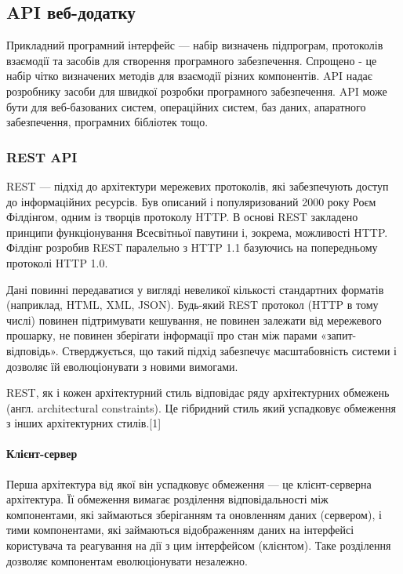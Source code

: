 
\subsection{API веб-додатку}
Прикладний програмний інтерфейс — набір визначень підпрограм, протоколів взаємодії та засобів для створення програмного забезпечення. Спрощено - це набір чітко визначених методів для взаємодії різних компонентів. API надає розробнику засоби для швидкої розробки програмного забезпечення. API може бути для веб-базованих систем, операційних систем, баз даних, апаратного забезпечення, програмних бібліотек тощо.

\subsubsection{REST API}
REST — підхід до архітектури мережевих протоколів, які забезпечують доступ до інформаційних ресурсів. Був описаний і популяризований 2000 року Роєм Філдінгом, одним із творців протоколу HTTP. В основі REST закладено принципи функціонування Всесвітньої павутини і, зокрема, можливості HTTP. Філдінг розробив REST паралельно з HTTP 1.1 базуючись на попередньому протоколі HTTP 1.0.

Дані повинні передаватися у вигляді невеликої кількості стандартних форматів (наприклад, HTML, XML, JSON). Будь-який REST протокол (HTTP в тому числі) повинен підтримувати кешування, не повинен залежати від мережевого прошарку, не повинен зберігати інформації про стан між парами «запит-відповідь». Стверджується, що такий підхід забезпечує масштабовність системи і дозволяє їй еволюціонувати з новими вимогами.

REST, як і кожен архітектурний стиль відповідає ряду архітектурних обмежень (англ. architectural constraints). Це гібридний стиль який успадковує обмеження з інших архітектурних стилів.[1]

\paragraph{Клієнт-сервер}
Перша архітектура від якої він успадковує обмеження — це клієнт-серверна архітектура. Її обмеження вимагає розділення відповідальності між компонентами, які займаються зберіганням та оновленням даних (сервером), і тими компонентами, які займаються відображенням даних на інтерфейсі користувача та реагування на дії з цим інтерфейсом (клієнтом). Таке розділення дозволяє компонентам еволюціонувати незалежно.

